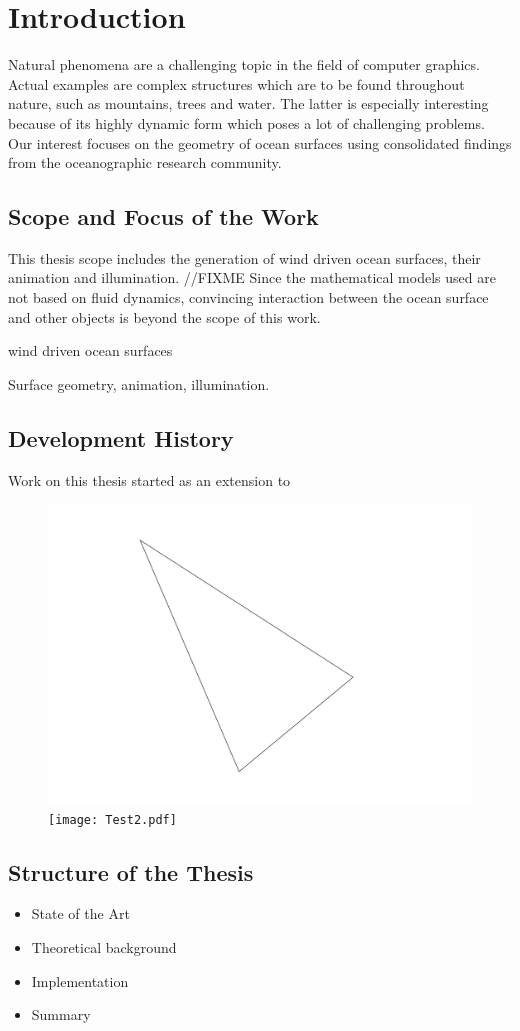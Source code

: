 \chapter{Introduction}

Natural phenomena are a challenging topic in the field of computer graphics.
Actual examples are complex structures which are to be found throughout nature,
such as mountains, trees and water. The latter is especially interesting
because of its highly dynamic form which poses a lot of challenging problems.
Our interest focuses on the geometry of ocean surfaces using
consolidated findings from the oceanographic research community.

\section{Scope and Focus of the Work}

This thesis scope includes the generation of wind driven ocean surfaces, their
animation and illumination. //FIXME
Since the mathematical models used are not based on fluid dynamics,
convincing interaction between the ocean surface and other objects is beyond the
scope of this work.

wind driven ocean surfaces

Surface geometry, animation, illumination.

\section{Development History}

Work on this thesis started as an extension to \cite{thesis:rost}

\begin{figure}[p]
\begin{center}
\includegraphics[scale=1.0]{test.pdf}
\texttt{[image: Test2.pdf]}
\end{center}
\end{figure}

\section{Structure of the Thesis}

\begin{itemize}

\item State of the Art
\item Theoretical background
\item Implementation
\item Summary

\end{itemize}

